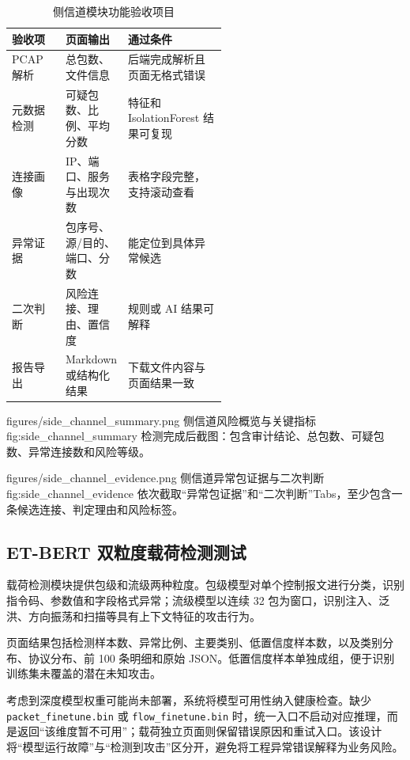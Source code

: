 \begin{table}[H]
\centering
\caption{侧信道模块功能验收项目}
\label{tab:side_function}
\small
\begin{tabularx}{\linewidth}{p{0.25\linewidth}p{0.29\linewidth}X}
\toprule
\textbf{验收项} & \textbf{页面输出} & \textbf{通过条件} \\
\midrule
PCAP 解析 & 总包数、文件信息 & 后端完成解析且页面无格式错误 \\
元数据检测 & 可疑包数、比例、平均分数 & 特征和 IsolationForest 结果可复现 \\
连接画像 & IP、端口、服务与出现次数 & 表格字段完整，支持滚动查看 \\
异常证据 & 包序号、源/目的、端口、分数 & 能定位到具体异常候选 \\
二次判断 & 风险连接、理由、置信度 & 规则或 AI 结果可解释 \\
报告导出 & Markdown 或结构化结果 & 下载文件内容与页面结果一致 \\
\bottomrule
\end{tabularx}
\end{table}

\RobotSecFigure
  {figures/side_channel_summary.png}
  {侧信道风险概览与关键指标}
  {fig:side_channel_summary}
  {检测完成后截图：包含审计结论、总包数、可疑包数、异常连接数和风险等级。}

\RobotSecFigure
  {figures/side_channel_evidence.png}
  {侧信道异常包证据与二次判断}
  {fig:side_channel_evidence}
  {依次截取“异常包证据”和“二次判断”Tabs，至少包含一条候选连接、判定理由和风险标签。}

\subsection{ET-BERT 双粒度载荷检测测试}
\label{subsec:payload}

载荷检测模块提供包级和流级两种粒度。包级模型对单个控制报文进行分类，识别指令码、参数值和字段格式异常；流级模型以连续 32 包为窗口，识别注入、泛洪、方向振荡和扫描等具有上下文特征的攻击行为。

页面结果包括检测样本数、异常比例、主要类别、低置信度样本数，以及类别分布、协议分布、前 100 条明细和原始 JSON。低置信度样本单独成组，便于识别训练集未覆盖的潜在未知攻击。

考虑到深度模型权重可能尚未部署，系统将模型可用性纳入健康检查。缺少 \texttt{packet\_finetune.bin} 或 \texttt{flow\_finetune.bin} 时，统一入口不启动对应推理，而是返回“该维度暂不可用”；载荷独立页面则保留错误原因和重试入口。该设计将“模型运行故障”与“检测到攻击”区分开，避免将工程异常错误解释为业务风险。

